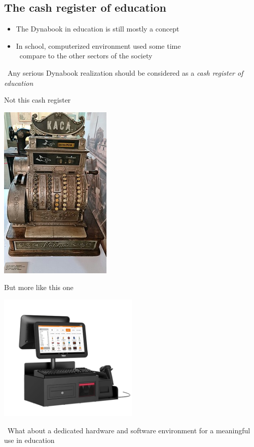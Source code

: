 \documentclass{beamer}
\newcommand{\tip}{\boldmath{\textcolor{red}{$\Rightarrow$}}}
\begin{document}
\subsection{The cash register of education}
\begin{frame}
  \begin{itemize}
  \item The Dynabook in education is still mostly a concept
  \item In school, computerized environment used some time\\
    \tip\ compare to the other sectors of the society
  \end{itemize}

  \vspace{20pt}
  
  \tip\ Any serious Dynabook realization should be considered as a
  \emph{cash register of education}
\end{frame}
%
\begin{frame}{Not this cash register}
  \begin{center}
      \includegraphics[width=0.4\textwidth]{Old_National_Cash_Register.jpg}
    \end{center}
\end{frame}
%
\begin{frame}{But more like this one}
  \begin{center}
    \includegraphics[width=0.5\textwidth]{Telpo-C68-02.png}
  \end{center}
  
  \tip\ What about a dedicated hardware and software environment for a
  meaningful use in education
\end{frame}
\end{document}
